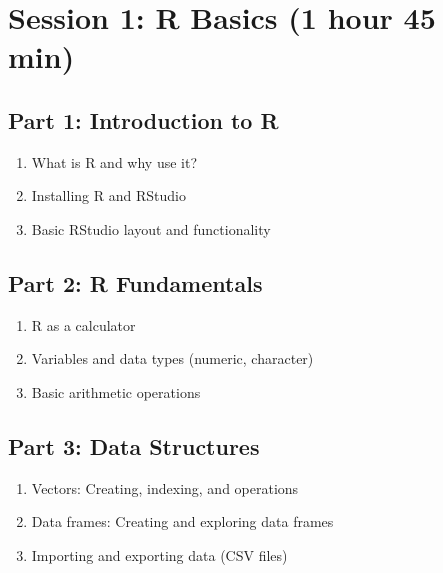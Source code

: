 \documentclass[
]{book}
\providecommand{\tightlist}{%
  \setlength{\itemsep}{0pt}\setlength{\parskip}{0pt}}
\begin{document}
\section*{Session 1: R Basics (1 hour 45 min)}\label{session-1-r-basics-1-hour-45-min}

\subsection*{Part 1: Introduction to R}\label{part-1-introduction-to-r}

\begin{enumerate}
\def\labelenumi{\arabic{enumi}.}
\tightlist
\item
  What is R and why use it?
\item
  Installing R and RStudio
\item
  Basic RStudio layout and functionality
\end{enumerate}

\subsection*{Part 2: R Fundamentals}\label{part-2-r-fundamentals}

\begin{enumerate}
\def\labelenumi{\arabic{enumi}.}
\tightlist
\item
  R as a calculator
\item
  Variables and data types (numeric, character)
\item
  Basic arithmetic operations
\end{enumerate}

\subsection*{Part 3: Data Structures}\label{part-3-data-structures}

\begin{enumerate}
\def\labelenumi{\arabic{enumi}.}
\tightlist
\item
  Vectors: Creating, indexing, and operations
\item
  Data frames: Creating and exploring data frames
\item
  Importing and exporting data (CSV files)
\end{enumerate}
\end{document}
